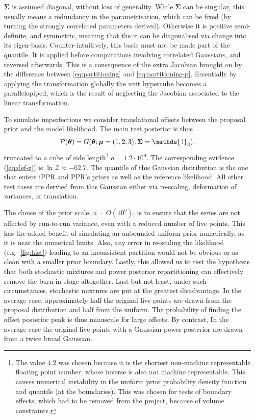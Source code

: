 \documentclass[usenatbib]{mnras}
\begin{document}
$\bm{\Sigma}$ is assumed diagonal, without loss of generality. While
$\bm{\Sigma}$ can be singular, this usually means a redundancy in the
parametrisation, which can be fixed (by turning the strongly
correlated parameters derived). Otherwise it is positive
semi-definite, and symmetric, meaning that the it can be diagonalised
via change into its eigen-basis. Counter-intuitively, this basis must
not be made part of the quantile. It is applied before computations
involving correlated Gaussians, and reversed afterwards. This is a
consequence of the extra Jacobian brought on by the difference between
\cref{eq:partitioning} and \cref{eq:partitioning-p}. Essentially by
applying the transformation globally the unit hypercube becomes a
parallelopiped, which is the result of neglecting the Jacobian
associated to the linear transformation. 

To simulate imperfections we consider translational offsets between
the proposal prior and the model likelihood.  The main test posterior
is thus
\begin{equation}
\bar{{\cal P}}(\bm{\theta}) = G(\bm{\theta}; \bm{\mu} =
  (1,2,3),\bm{\Sigma} = \mathds{1}_{3}),
\end{equation}
truncated to a cube of side length\footnote{The value \(1.2\) was
  chosen because it is the shortest non-machine representable floating
  point number, whose inverse is also not machine representable. This
  causes numerical instability in the uniform prior probability
  density function and quantile (at the boundaries). This was chosen
  for tests of boundary effects, which had to be removed from the
  project, because of volume constraints. } \(a = 1.2 \cdot
10^{9}\). The corresponding evidence (\cref{eq:def-z}) is
\(\ln \mathcal{Z}\approx-62.7\). The quantile of this Gaussian
distribution is the one that enters iPPR and PPR's priors as well as
the reference likelihood. All other test cases are dervied from this
Gaussian either via re-scaling, deformation of variances, or
translation.

The choice of the prior scale: \(a = O(10^{9})\), is to ensure that
the series are not affected by run-to-run variance, even with a
reduced number of live points. This has the added benefit of
simulating an unbounded uniform prior numerically, as it is near the
numerical limits. Also, any error in re-scaling the likelihood
(e.g.~\cref{fig:hist}) leading to an inconsistent partition would not
be obvious or as clean with a smaller prior boundary. Lastly, this
allowed us to test the hypothesis that both stochastic mixtures and
power posterior repartitioning can effectively remove the burn-in
stage altogether. Last but not least, under such circumstances,
stochastic mixtures are put at the greatest disadvantage. In the
average case, approximately half the original live points are drawn
from the proposal distribution and half from the uniform. The
probability of finding the offset posterior peak is thus minuscule for
large offsets. By contrast, In the average case the original live
points with a Gaussian power posterior are drawn from a twice broad
Gaussian.
\end{document}
